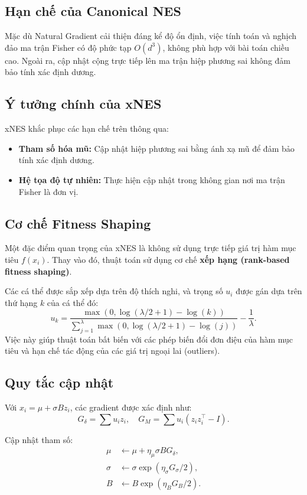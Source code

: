 \documentclass[12pt, a4paper]{article}
\begin{document}
	\subsection{Hạn chế của Canonical NES}
	Mặc dù Natural Gradient cải thiện đáng kể độ ổn định, việc tính toán và nghịch đảo ma trận Fisher có độ phức tạp $O(d^3)$, không phù hợp với bài toán chiều cao. Ngoài ra, cập nhật cộng trực tiếp lên ma trận hiệp phương sai không đảm bảo tính xác định dương.
	
	\subsection{Ý tưởng chính của xNES}
	xNES khắc phục các hạn chế trên thông qua:
	\begin{itemize}
		\item \textbf{Tham số hóa mũ:} Cập nhật hiệp phương sai bằng ánh xạ mũ để đảm bảo tính xác định dương.
		\item \textbf{Hệ tọa độ tự nhiên:} Thực hiện cập nhật trong không gian nơi ma trận Fisher là đơn vị.
	\end{itemize}
	
	\subsection{Cơ chế Fitness Shaping}
	Một đặc điểm quan trọng của xNES là không sử dụng trực tiếp giá trị hàm mục tiêu $f(x_i)$. Thay vào đó, thuật toán sử dụng cơ chế \textbf{xếp hạng (rank-based fitness shaping)}. 
	
	Các cá thể được sắp xếp dựa trên độ thích nghi, và trọng số $u_i$ được gán dựa trên thứ hạng $k$ của cá thể đó:
	\begin{equation}
		u_k = \frac{\max(0, \log(\lambda/2 + 1) - \log(k))}{\sum_{j=1}^\lambda \max(0, \log(\lambda/2 + 1) - \log(j))} - \frac{1}{\lambda}.
	\end{equation}
	Việc này giúp thuật toán bất biến với các phép biến đổi đơn điệu của hàm mục tiêu và hạn chế tác động của các giá trị ngoại lai (outliers).
	
	\subsection{Quy tắc cập nhật}
	Với $x_i = \mu + \sigma B z_i$, các gradient được xác định như:
	\[
	G_\delta = \sum u_i z_i, \quad
	G_M = \sum u_i (z_i z_i^\top - I).
	\]
	
	Cập nhật tham số:
	\begin{align}
		\mu &\leftarrow \mu + \eta_\mu \sigma B G_\delta,\\
		\sigma &\leftarrow \sigma \exp(\eta_\sigma G_\sigma /2),\\
		B &\leftarrow B \exp(\eta_B G_B /2).
	\end{align}
	
\end{document}
